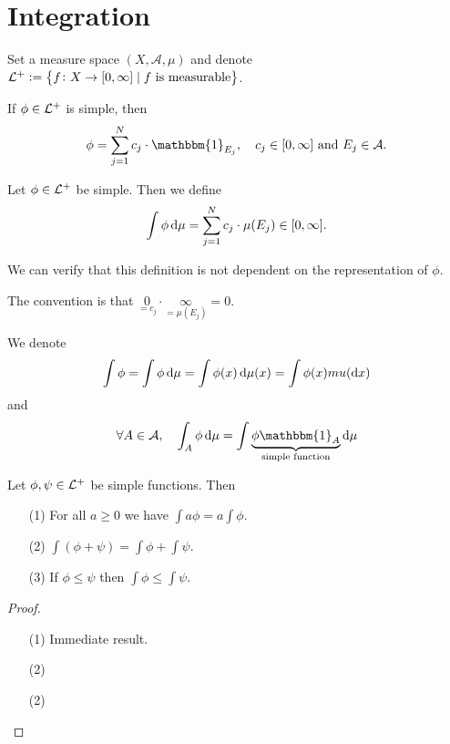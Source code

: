 \documentclass[11pt,a4paper]{article}
\newcommand{\A}{\mathcal A}
\begin{document}
\section{Integration}
Set a measure space $(X,\A,\mu)$ and denote
$\mathcal{L}^+ := \set{f \colon X \to [0,\infty] \mid \text{$f$ is measurable}}$.
\begin{remark}
  If $\phi \in \mathcal{L}^+$ is simple, then
  \[
    \phi = 
    \sum_{j=1}^{N} c_j \cdot \mathbbm{1}_{E_j}, \quad
    c_j \in [0,\infty] \stand E_j \in \A.
  \]
\end{remark}

\begin{definition}
  Let $\phi \in \mathcal{L}^+$ be simple.
  Then we define
  \[
    \int \phi \dmu = 
    \sum_{j=1}^{N} c_j \cdot \mu(E_j) \in [0,\infty].
  \]
\end{definition}

\begin{remark}
  We can verify that this definition is not dependent on the representation
  of $\phi$.
\end{remark}
\begin{remark}
  The convention is that
  $\underset{=c_j}{0} \cdot \underset{=\mu(E_j)}{\infty} = 0$.
\end{remark}
\begin{remark}
  We denote
  \[
    \int \phi =
    \int \phi \dmu =
    \int \phi(x) \dmu(x) =
    \int \phi(x) mu(\dx)
  \]
  and
  \[
    \forall A \in \A, \quad
    \int_{A} \phi \dmu =
    \int \underbrace{\phi \mathbbm{1}_{A}}_{\text{simple function}} \dmu
  \]
\end{remark}

\begin{proposition}
  Let $\phi, \psi \in \mathcal{L}^+$ be simple functions. Then
  \begin{enumerate}
    \item[(1)] For all $a \geq 0$ we have $\int a \phi = a \int \phi$.
    \item[(2)] $\int (\phi + \psi) = \int \phi + \int \psi$.
    \item[(3)] If $\phi \le \psi$ then $\int \phi \le \int \psi$.
  \end{enumerate}
\end{proposition}
\begin{proof} \phantom{}
\begin{enumerate}
  \item[(1)] Immediate result.
  \item[(2)] 
  \item[(2)] 
\end{enumerate}
\end{proof}
\end{document}
